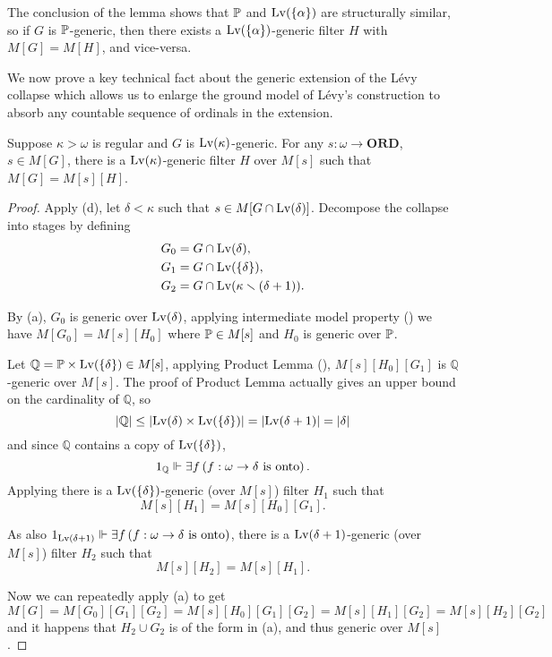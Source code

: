 \begin{remark}
    The conclusion of the lemma shows that \(\P\) and \(\Lv(\set{\alpha})\) are structurally similar,
    so if \(G\) is \(\P\)-generic, then there exists a \(\Lv(\set{\alpha})\)-generic filter \(H\) with \(M[G] = M[H]\),
    and vice-versa.
\end{remark}


\newcommand*{\Q}{{\mathbb{Q}}}
We now prove a key technical fact about the generic extension of the Lévy collapse
which allows us to enlarge the ground model of Lévy's construction to absorb any countable sequence of ordinals in the extension.
\begin{lemma} \label{lemma:important}
    Suppose \(\kappa>\omega\) is regular and \(G\) is \(\Lv(\kappa)\)-generic.
    For any \(s:\omega\to\mathbf{ORD}\), \(s\in M[G]\),
    there is a \(\Lv(\kappa)\)-generic filter \(H\) over \(M[s]\)
    such that \(M[G] = M[s][H]\).
\end{lemma}
\begin{proof}
    Apply  (d), let \(\delta<\kappa\) such that \(s \in M[G\cap\Lv(\delta)]\).
    Decompose the collapse into stages by defining
    \begin{align*}
        G_0 &= G\cap\Lv(\delta), \\
        G_1 &= G\cap\Lv(\set{\delta}), \\
        G_2 &= G\cap\Lv(\kappa\setminus(\delta+1)).
    \end{align*}

    By  (a), \(G_0\) is generic over \(\Lv(\delta)\),
    applying intermediate model property ()
    we have \(M[G_0] = M[s][H_0]\) where \(\P\in M[s]\) and \(H_0\) is generic over \(\P\).

    Let \(\Q = \P\times\Lv(\set{\delta}) \in M[s]\),
    applying Product Lemma (), \(M[s][H_0][G_1]\) is \(\Q\)-generic over \(M[s]\).
    The proof of Product Lemma actually gives an upper bound on the cardinality of \(\Q\), so
    \[ \abs{\Q} \leq \abs{\Lv(\delta)\times\Lv(\set{\delta})} = \abs{\Lv(\delta+1)} = \abs{\delta} \]
    and since \(\Q\) contains a copy of \(\Lv(\set{\delta})\),
    \[ 1_\Q \forces \exists f\paren{f:\omega\to\delta \text{ is onto}}. \]
    Applying 
    there is a \(\Lv(\set{\delta})\)-generic (over \(M[s]\)) filter \(H_1\) such that \[ M[s][H_1] = M[s][H_0][G_1].\]

    As also \( 1_{\Lv(\delta+1)} \forces \exists f\paren{f:\omega\to\delta \text{ is onto}} \),
    there is a \(\Lv(\delta+1)\)-generic (over \(M[s]\)) filter \(H_2\) such that \[ M[s][H_2] = M[s][H_1]. \]

    Now we can repeatedly apply  (a) to get
    \[ M[G] = M[G_0][G_1][G_2] = M[s][H_0][G_1][G_2] = M[s][H_1][G_2] = M[s][H_2][G_2] \]
    and it happens that \(H_2 \cup G_2\) is of the form in  (a), and thus generic over \(M[s]\).
\end{proof}




